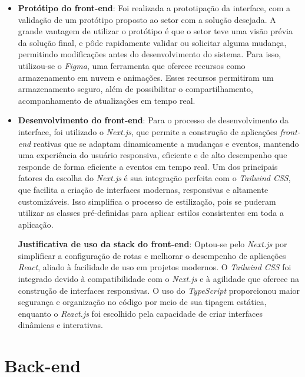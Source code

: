 \begin{itemize}
    \item \textbf{Protótipo do front-end}: Foi realizada a prototipação da interface, com a validação de um protótipo proposto ao setor com a solução desejada. A grande vantagem de utilizar o protótipo é que o setor teve uma visão prévia da solução final, e pôde rapidamente validar ou solicitar alguma mudança, permitindo modificações antes do desenvolvimento do sistema. Para isso, utilizou-se o \textit{Figma}, uma ferramenta que oferece recursos como armazenamento em nuvem e animações. Esses recursos permitiram um armazenamento seguro, além de possibilitar o compartilhamento, acompanhamento de atualizações em tempo real.
    
    \item \textbf{Desenvolvimento do front-end}: Para o processo de desenvolvimento da interface, foi utilizado o \textit{Next.js}, que permite a construção de aplicações \textit{front-end} reativas que se adaptam dinamicamente a mudanças e eventos, mantendo uma experiência do usuário responsiva, eficiente e de alto desempenho que responde de forma eficiente a eventos em tempo real. Um dos principais fatores da escolha do \textit{Next.js} é sua integração perfeita com o \textit{Tailwind CSS}, que facilita a criação de interfaces modernas, responsivas e altamente customizáveis. Isso simplifica o processo de estilização, pois se puderam utilizar as classes pré-definidas para aplicar estilos consistentes em toda a aplicação.
    
    \textbf{Justificativa de uso da stack do front-end}: Optou-se pelo \textit{Next.js} por simplificar a configuração de rotas e melhorar o desempenho de aplicações \textit{React}, aliado à facilidade de uso em projetos modernos. O \textit{Tailwind CSS} foi integrado devido à compatibilidade com o \textit{Next.js} e à agilidade que oferece na construção de interfaces responsivas. O uso do \textit{TypeScript} proporcionou maior segurança e organização no código por meio de sua tipagem estática, enquanto o \textit{React.js} foi escolhido pela capacidade de criar interfaces dinâmicas e interativas.
\end{itemize}

\section{Back-end}

